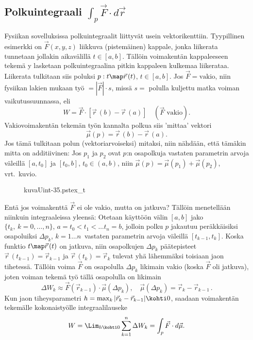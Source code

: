 \subsection*{Polkuintegraali $\int_p \vec F \cdot d\vec r$}

Fysiikan sovelluksissa polkuintegraalit liittyvät usein vektorikenttiin. Tyypillinen esimerkki
on  $\vec F(x,y,z)$ liikkuva (pistemäinen) kappale, jonka liikerata
tunnetaan jollakin aikavälillä $t\in [a,b]$. Tällöin voimakentän kappaleeseen tekemä
y lasketaan polkuintegraalina pitkin kappaleen kulkemaa liikerataa. Liikerata
tulkitaan siis poluksi $p:t \map \vec r\,(t)$, $t\in [a,b]$. Jos $\vec F=\text{vakio}$, niin
fysiikan lakien mukaan työ $=|\vec F| \cdot s$, missä $s=$ polulla kuljettu matka voiman
vaikutussuunnassa, eli
\[
W=\vec F\cdot[\vec r\,(b)-\vec r\,(a)]\quad (\vec F\text{ vakio}).
\]
Vakiovoimakentän tekemän työn kannalta polkua siis 'mittaa' vektori
\[
\vec\mu(p)=\vec r\,(b)-\vec r\,(a).
\]
Jos tämä tulkitaan polun (vektoriarvoiseksi) mitaksi, niin nähdään, että tämäkin mitta on
additiivinen: Jos $p_1$ ja $p_2$ ovat $p$:n osapolkuja vastaten parametrin arvoja väleillä
$[a,t_0]$ ja $[t_0,b]$, $t_0\in (a,b)$, niin $\vec \mu(p)=\vec \mu(p_1)+\vec\mu(p_2)$,
vrt.\ kuvio.
\begin{figure}[H]
\begin{center}
{kuvaUint-35.pstex_t}
\end{center}
\end{figure}
Entä jos voimakenttä $\vec F$ ei ole vakio, mutta on jatkuva? Tällöin menetellään niinkuin
integraaleissa yleensä: Otetaan käyttöön välin $[a,b]$ jako $\{t_k, \ k=0,\ldots,n\}$,
$a=t_0<t_1<\ldots t_n=b$, jolloin polku $p$ jakautuu peräkkäisiksi osapoluiksi $\Delta p_k$,
$k=1\ldots n\,$ vastaten parametrin arvoja väleillä $[t_{k-1},t_k]$. Koska funktio
$t \map \vec r\,(t)$ on jatkuva, niin osapolkujen $\Delta p_k$ päätepisteet 
$\vec r\,(t_{k-1})=\vec r_{k-1}$ ja $\vec r\,(t_k)=\vec r_k$ tulevat yhä lähemmäksi toisiaan
jaon tihetessä. Tällöin voima $\vec F$ on osapolulla $\Delta p_k$ likimain vakio 
(koska $\vec F$ oli jatkuva), joten voiman tekemä työ tällä osapolulla on likimain
\[
\Delta W_k\approx\vec F(\vec r_{k-1})\cdot\vec\mu(\Delta p_k),\quad 
\vec\mu(\Delta p_k)=\vec r_k-\vec r_{k-1}\,.
\]
Kun jaon tiheysparametri $h=\max_k|\vec r_k-\vec r_{k-1}|\kohti 0$, saadaan voimakentän
tekemälle kokonaistyölle integraalilauseke
\[
W=\Lim_{h\kohti 0}\sum_{k=1}^n\Delta W_k=\int_p \vec F\cdot d\vec\mu.
\]
